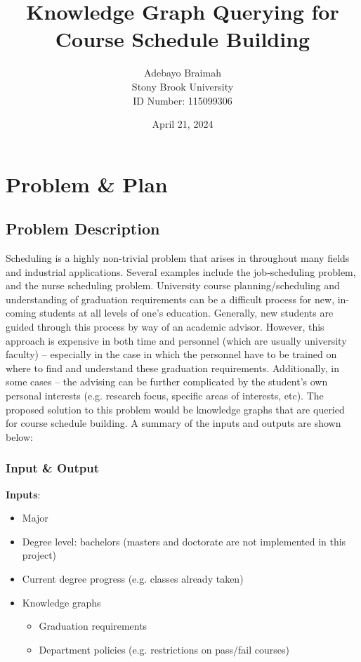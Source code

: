 \documentclass[12pt]{article}
\title{\Large \bf 
Knowledge Graph Querying for Course Schedule Building
}
\author{
{\rm Adebayo Braimah}\\
Stony Brook University \\
{\rm ID Number: 115099306}
}
\date{April 21, 2024}
\begin{document}
    
    \maketitle
        
    \section{Problem \& Plan}
    \label{sec:prob_plan}
    
    \subsection{Problem Description}
    \label{subsec:problem}
    Scheduling is a highly non-trivial problem that arises in throughout many fields and industrial applications. Several examples include the job-scheduling problem\cite{scheduling1972}, and the nurse scheduling problem\cite{nurse2017}.
    University course planning/scheduling and understanding of graduation requirements can be a difficult process for new, in-coming students at all levels of one's education\cite{lunch2023}. Generally, new students are guided through this process by way of an academic advisor. However, this approach is expensive in both time and personnel (which are usually university faculty) -- especially in the case in which the personnel have to be trained on where to find and understand these graduation requirements. Additionally, in some cases -- the advising can be further complicated by the student's own personal interests (e.g. research focus, specific areas of interests, etc). The proposed solution to this problem would be knowledge graphs that are queried for course schedule building. A summary of the inputs and outputs are shown below:

    \subsubsection{Input \& Output}
    \label{subsubsec:in-out}
    
    \textbf{Inputs}:

    \begin{itemize}
        \label{items:inputs}
        \item Major
        \item Degree level: bachelors (masters and doctorate are not implemented in this project)
        \item Current degree progress (e.g. classes already taken)
        \item Knowledge graphs
        \begin{itemize}
            \item Graduation requirements
            \item Department policies (e.g. restrictions on pass/fail courses)
        \end{itemize}
    \end{itemize}
\end{document}
